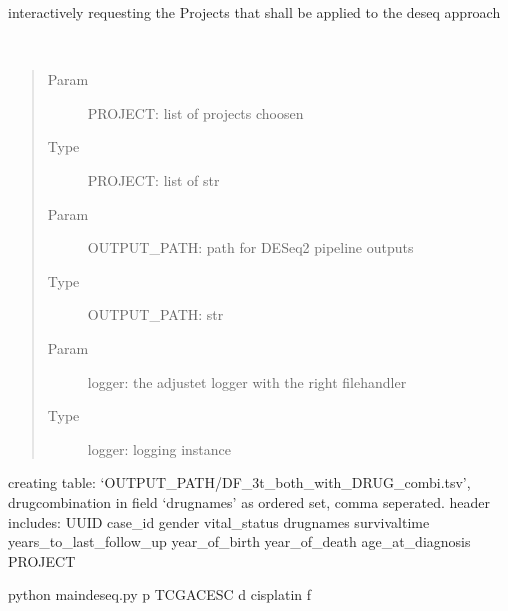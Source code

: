 \documentclass[letterpaper,10pt,english]{sphinxmanual}
\begin{document}
\begin{fulllineitems}
\label{\detokenize{index:choose_therapy.Choose_project}}
\sphinxAtStartPar
interactively requesting the Projects that shall be applied to the deseq
approach

\end{fulllineitems}

\label{\detokenize{index:module-create_matrix_new}}

\begin{fulllineitems}
\label{\detokenize{index:create_matrix_new.correct_drugs}}~\begin{quote}\begin{description}
\item[{Param}] \leavevmode
\sphinxAtStartPar
PROJECT: list of projects choosen

\item[{Type}] \leavevmode
\sphinxAtStartPar
PROJECT: list of str

\item[{Param}] \leavevmode
\sphinxAtStartPar
OUTPUT\_PATH: path for DESeq2 pipeline outputs

\item[{Type}] \leavevmode
\sphinxAtStartPar
OUTPUT\_PATH: str

\item[{Param}] \leavevmode
\sphinxAtStartPar
logger: the adjustet logger with the right filehandler

\item[{Type}] \leavevmode
\sphinxAtStartPar
logger: logging instance

\end{description}\end{quote}

\sphinxAtStartPar
creating table: ‘OUTPUT\_PATH/DF\_3t\_both\_with\_DRUG\_combi.tsv’,
drugcombination in field ‘drugnames’ as ordered set, comma seperated.
header includes: UUID    case\_id gender  vital\_status    drugnames
survivaltime    years\_to\_last\_follow\_up year\_of\_birth   year\_of\_death
age\_at\_diagnosis        PROJECT

\begin{sphinxVerbatim}[commandchars=\\\{\}]
\PYGZdl{} python main\PYGZus{}deseq.py \PYGZhy{}p TCGA\PYGZhy{}CESC \PYGZhy{}d cisplatin \PYGZhy{}f 
\end{sphinxVerbatim}

\end{fulllineitems}
\end{document}
